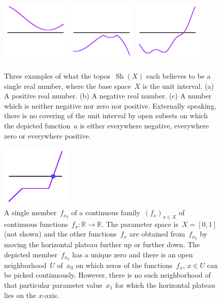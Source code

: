 \documentclass[oneside,reqno]{amsart}
\theoremstyle{definition}
\theoremstyle{plain}
\theoremstyle{remark}
\newcommand{\RR}{\mathbb{R}}
\DeclareMathOperator{\Sh}{Sh}
\renewcommand{\_}{\mathpunct{.}\,}
\newcommand{\?}{\,{:}\,}
\begin{document}
\begin{figure}
  \includegraphics[height=3cm]{trichotomy-1}
  \includegraphics[height=3cm]{trichotomy-2}
  \includegraphics[height=3cm]{trichotomy-3}
  \caption{\label{fig:trichotomy} Three examples of what the topos~$\Sh(X)$
  each believes to be a single real number, where the base space~$X$ is the
  unit interval. (a) A positive real number. (b) A negative real number. (c) A
  number which is neither negative nor zero nor positive. Externally speaking,
  there is no covering of the unit interval by open subsets on which the
  depicted function~$a$ is either everywhere negative, everywhere zero or everywhere
  positive.}
\end{figure}

\begin{figure}
  \includegraphics[height=3cm]{zeros-in-families-still}
  \caption{\label{fig:ivt} A single member~$f_{x_0}$ of a continuous
  family~$(f_x)_{x \in X}$ of continuous functions~$f_x : \RR \to \RR$. The
  parameter space is~$X = [0,1]$ (not shown) and the other functions~$f_x$ are
  obtained from~$f_{x_0}$ by moving the horizontal plateau further up or further
  down. The depicted member~$f_{x_0}$ has a unique
  zero and there is an open neighborhood~$U$ of~$x_0$ on which zeros of the
  functions~$f_x$, $x \in U$ can be picked continuously. However, there is no
  such neighborhood of that particular parameter value~$x_1$ for which the
  horizontal plateau lies on the $x$-axis.}
\end{figure}
\end{document}

